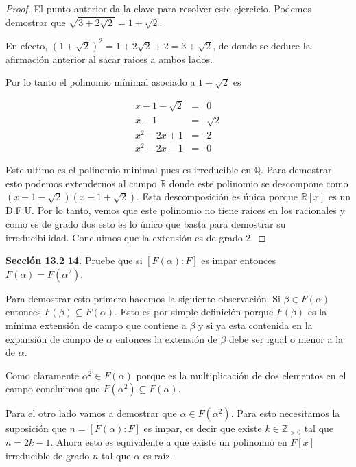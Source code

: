 \documentclass[letter,twoside,12pt]{article}
\begin{document}
\begin{proof}
El punto anterior da la clave para resolver este ejercicio. Podemos demostrar que $ \sqrt{3+2\sqrt{2}} = 1+\sqrt{2}$.

En efecto, $ (1+\sqrt{2})^2=1+2\sqrt{2}+2 = 3+\sqrt{2} $, de donde se deduce la afirmación anterior al sacar raices a ambos lados.

Por lo tanto el polinomio mínimal asociado a $ 1+\sqrt{2} $ es

\begin{eqnarray}
x-1-\sqrt{2}&=&0 \nonumber
\\x-1&=&\sqrt{2} \nonumber
\\x^2-2x+1&=&2 \nonumber
\\x^2-2x-1&=&0 \nonumber
\end{eqnarray}

Este ultimo es el polinomio minimal pues es irreducible en $ \mathbb{Q} $. Para demostrar esto podemos extendernos al campo $\mathbb{R}$ donde este polinomio se descompone como $ (x-1-\sqrt{2})(x-1+\sqrt{2}) $. Esta descomposición es única porque $ \mathbb{R}[x] $ es un D.F.U. Por lo tanto, vemos que este polinomio no tiene raices en los racionales y como es de grado dos esto es lo único que basta para demostrar su irreducibilidad. Concluimos que la extensión es de grado 2.
 
\end{proof}

\textbf{Sección 13.2} \textbf{14.} Pruebe que si $ [F(\alpha):F] $ es impar entonces $ F(\alpha)=F(\alpha^2) $.

Para demostrar esto primero hacemos la siguiente observación. Si $ \beta \in F(\alpha) $ entonces $ F(\beta) \subseteq F(\alpha) $. Esto es por simple definición porque $ F(\beta) $ es la mínima extensión de campo que contiene a $ \beta $ y si ya esta contenida en la expansión de campo de $ \alpha $ entonces la extensión de $ \beta $ debe ser igual o menor a la de $ \alpha $.

Como claramente $ \alpha^2 \in F(\alpha) $ porque es la multiplicación de dos elementos en el campo concluimos que $ F(\alpha^2) \subseteq F(\alpha) $.

Para el otro lado vamos a demostrar que $ \alpha \in F(\alpha^2)$. Para esto necesitamos la suposición que $n =  [F(\alpha):F] $ es impar, es decir que existe $ k \in \mathbb{Z}_{>0} $ tal que $ n = 2k-1 $. Ahora esto es equivalente a que existe un polinomio en $ F[x] $ irreducible de grado $ n $ tal que $ \alpha $ es raíz.
\end{document}

